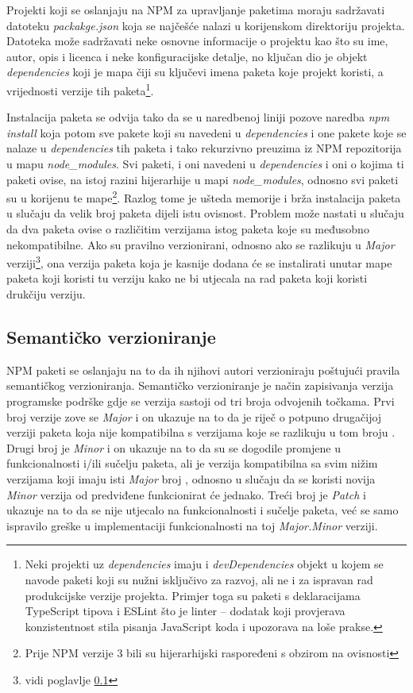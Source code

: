 \documentclass[times, utf8, diplomski, numeric]{fer}
\newcommand{\razmakp}{\vspace{18pt}}
\begin{document}
\razmakp

Projekti koji se oslanjaju na NPM za upravljanje paketima moraju sadržavati datoteku \emph{packakge.json} koja se najčešće nalazi u korijenskom direktoriju projekta.
Datoteka može sadržavati neke osnovne informacije o projektu kao što su ime, autor, opis i licenca i neke konfiguracijske detalje, no ključan dio je objekt \emph{dependencies} koji je mapa čiji su ključevi imena paketa koje projekt koristi, a vrijednosti verzije tih paketa\footnote{
    Neki projekti uz \emph{dependencies} imaju i \emph{devDependencies} objekt u kojem se navode paketi koji su nužni isključivo za razvoj, ali ne i za ispravan rad produkcijske verzije projekta. Primjer toga su paketi s deklaracijama TypeScript tipova i ESLint što je linter – dodatak koji provjerava konzistentnost stila pisanja JavaScript koda i upozorava na loše prakse.
}.

Instalacija paketa se odvija tako da se u naredbenoj liniji pozove naredba \emph{npm install} koja potom sve pakete koji su navedeni u \emph{dependencies} i one pakete koje se nalaze u \emph{dependencies} tih paketa i tako rekurzivno preuzima iz NPM repozitorija u mapu \emph{node\_modules}\citep{npm_docs}.
Svi paketi, i oni navedeni u \emph{dependencies} i oni o kojima ti paketi ovise, na istoj razini hijerarhije u mapi \emph{node\_modules}, odnosno svi paketi su u korijenu te mape\footnote{Prije NPM verzije 3 bili su hijerarhijski raspoređeni s obzirom na ovisnosti}.
Razlog tome je ušteda memorije i brža instalacija paketa u slučaju da velik broj paketa dijeli istu ovisnost.
Problem može nastati u slučaju da dva paketa ovise o različitim verzijama istog paketa koje su međusobno nekompatibilne.
Ako su pravilno verzionirani, odnosno ako se razlikuju u \emph{Major} verziji\footnote{vidi poglavlje \ref{sec:semver}}, ona verzija paketa koja je kasnije dodana će se instalirati unutar mape paketa koji koristi tu verziju kako ne bi utjecala na rad paketa koji koristi drukčiju verziju\citep{npm_npm3}.


\newpage
\subsection{Semantičko verzioniranje} \label{sec:semver}

NPM paketi se oslanjaju na to da ih njihovi autori verzioniraju poštujući pravila semantičkog verzioniranja.
Semantičko verzioniranje je način zapisivanja verzija programske podrške gdje se verzija sastoji od tri broja odvojenih točkama.
Prvi broj verzije zove se \emph{Major} i on ukazuje na to da je riječ o potpuno drugačijoj verziji paketa koja nije kompatibilna s verzijama koje se razlikuju u tom broju .
Drugi broj je \emph{Minor} i on ukazuje na to da su se dogodile promjene u funkcionalnosti i/ili sučelju paketa, ali je verzija kompatibilna sa svim nižim verzijama koji imaju isti \emph{Major} broj , odnosno u slučaju da se koristi novija \emph{Minor} verzija od predviđene funkcionirat će jednako.
Treći broj je \emph{Patch} i ukazuje na to da se nije utjecalo na funkcionalnosti i sučelje paketa, već se samo ispravilo greške u implementaciji funkcionalnosti na toj \emph{Major.Minor} verziji\citep{semver}.
\end{document}
